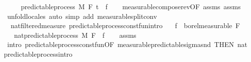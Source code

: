 \begin{isabellebody}
\ \ \ \ \ {\isachardoublequoteopen}predictable{\isacharunderscore}{\kern0pt}process\ M\ F\ t\ {\isacharparenleft}{\kern0pt}{\isasymlambda}{\isacharunderscore}{\kern0pt}{\isachardot}{\kern0pt}\ f{\isacharparenright}{\kern0pt}{\isachardoublequoteclose}\isanewline
%
\isadelimproof
\ \ %
\endisadelimproof
%
\isatagproof
{}\isamarkupfalse%
\ measurable{\isacharunderscore}{\kern0pt}compose{\isacharunderscore}{\kern0pt}rev{\isacharbrackleft}{\kern0pt}OF\ assms{\isacharparenleft}{\kern0pt}{}{\isacharparenright}{\kern0pt}{\isacharbrackright}{\kern0pt}\ assms{\isacharparenleft}{\kern0pt}{}{\isacharparenright}{\kern0pt}\ \isamarkupfalse%
\ {\isacharparenleft}{\kern0pt}unfold{\isacharunderscore}{\kern0pt}locales{\isacharparenright}{\kern0pt}\ {\isacharparenleft}{\kern0pt}auto\ simp\ add{\isacharcolon}{\kern0pt}\ measurable{\isacharunderscore}{\kern0pt}split{\isacharunderscore}{\kern0pt}conv{\isacharparenright}{\kern0pt}%
\endisatagproof
{\isafoldproof}%
%
\isadelimproof
\isanewline
%
\endisadelimproof
\isanewline
{}\isamarkupfalse%
\ {\isacharparenleft}{\kern0pt}\ nat{\isacharunderscore}{\kern0pt}filtered{\isacharunderscore}{\kern0pt}measure{\isacharparenright}{\kern0pt}\ predictable{\isacharunderscore}{\kern0pt}process{\isacharunderscore}{\kern0pt}const{\isacharunderscore}{\kern0pt}fun{\isacharprime}{\kern0pt}{\isacharbrackleft}{\kern0pt}intro{\isacharbrackright}{\kern0pt}{\isacharcolon}{\kern0pt}\isanewline
\ \ \ {\isachardoublequoteopen}f\ {\isasymin}\ borel{\isacharunderscore}{\kern0pt}measurable\ {\isacharparenleft}{\kern0pt}F\ {}{\isacharparenright}{\kern0pt}{\isachardoublequoteclose}\isanewline
\ \ \ {\isachardoublequoteopen}nat{\isacharunderscore}{\kern0pt}predictable{\isacharunderscore}{\kern0pt}process\ M\ F\ {\isacharparenleft}{\kern0pt}{\isasymlambda}{\isacharunderscore}{\kern0pt}{\isachardot}{\kern0pt}\ f{\isacharparenright}{\kern0pt}{\isachardoublequoteclose}\isanewline
%
\isadelimproof
\ \ %
\endisadelimproof
%
\isatagproof
{}\isamarkupfalse%
\ assms\ \isamarkupfalse%
\ {\isacharparenleft}{\kern0pt}intro\ predictable{\isacharunderscore}{\kern0pt}process{\isacharunderscore}{\kern0pt}const{\isacharunderscore}{\kern0pt}fun{\isacharbrackleft}{\kern0pt}OF\ measurable{\isacharunderscore}{\kern0pt}predictable{\isacharunderscore}{\kern0pt}sigma{\isacharunderscore}{\kern0pt}snd{\isacharprime}{\kern0pt}{\isacharcomma}{\kern0pt}\ THEN\ nat{\isacharunderscore}{\kern0pt}predictable{\isacharunderscore}{\kern0pt}process{\isachardot}{\kern0pt}intro{\isacharbrackright}{\kern0pt}{\isacharparenright}{\kern0pt}%

\end{isabellebody}

